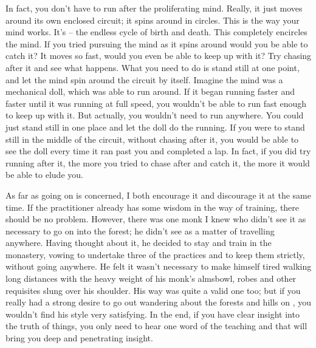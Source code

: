 In fact, you don't have to run after the proliferating mind. Really, it just moves around its own enclosed circuit; it spins around in circles. This is the way your mind works. It's  -- the endless cycle of birth and death. This completely encircles the mind. If you tried pursuing the mind as it spins around would you be able to catch it? It moves so fast, would you even be able to keep up with it? Try chasing after it and see what happens. What you need to do is stand still at one point, and let the mind spin around the circuit by itself. Imagine the mind was a mechanical doll, which was able to run around. If it began running faster and faster until it was running at full speed, you wouldn't be able to run fast enough to keep up with it. But actually, you wouldn't need to run anywhere. You could just stand still in one place and let the doll do the running. If you were to stand still in the middle of the circuit, without chasing after it, you would be able to see the doll every time it ran past you and completed a lap. In fact, if you did try running after it, the more you tried to chase after and catch it, the more it would be able to elude you.

As far as going on  is concerned, I both encourage it and discourage it at the same time. If the practitioner already has some wisdom in the way of training, there should be no problem. However, there was one monk I knew who didn't see it as necessary to go on  into the forest; he didn't see  as a matter of travelling anywhere. Having thought about it, he decided to stay and train in the monastery, vowing to undertake three of the  practices and to keep them strictly, without going anywhere. He felt it wasn't necessary to make himself tired walking long distances with the heavy weight of his monk's almsbowl, robes and other requisites slung over his shoulder. His way was quite a valid one too; but if you really had a strong desire to go out wandering about the forests and hills on , you wouldn't find his style very satisfying. In the end, if you have clear insight into the truth of things, you only need to hear one word of the teaching and that will bring you deep and penetrating insight.

